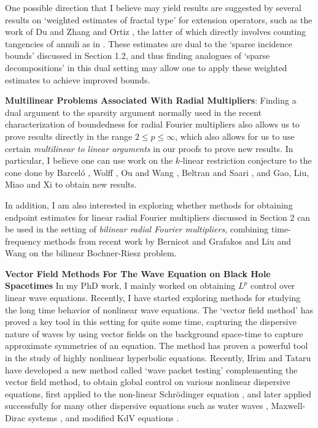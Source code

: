 \documentclass[11pt]{article}
\begin{document}
One possible direction that I believe may yield results are suggested by several results on `weighted estimates of fractal type' for extension operators, such as the work of Du and Zhang \cite{DuZhang} and Ortiz \cite{Ortiz}, the latter of which directly involves counting tangencies of annuli as in \cite{HeoNazarovSeeger}. These estimates are dual to the `sparse incidence bounds' discussed in Section 1.2, and thus finding analogues of `sparse decompositions' in this dual setting may allow one to apply these weighted estimates to achieve improved bounds.

{\bf Multilinear Problems Associated With Radial Multipliers}: Finding a dual argument to the sparsity argument normally used in the recent characterization of boundedness for radial Fourier multipliers also allows us to prove results directly in the range $2 \leq p \leq \infty$, which also allows for us to use certain \emph{multilinear to linear arguments} in our proofs to prove new results. In particular, I believe one can use work on the $k$-linear restriction conjecture to the cone done by Barcel\'{o} \cite{Barcelo}, Wolff \cite{Wolff}, Ou and Wang \cite{OuWang}, Beltran and Saari \cite{BeltranSaari}, and Gao, Liu, Miao and Xi \cite{GaoLiuMiaoXi} to obtain new results.

In addition, I am also interested in exploring whether methods for obtaining endpoint estimates for linear radial Fourier multipliers discussed in Section 2 can be used in the setting of \emph{bilinear radial Fourier multipliers}, combining time-frequency methods from recent work by Bernicot and Grafakos \cite{BernicotGrafakos} and Liu and Wang \cite{LiuWang} on the bilinear Bochner-Riesz problem.


{\bf Vector Field Methods For The Wave Equation on Black Hole Spacetimes} In my PhD work, I mainly worked on obtaining $L^p$ control over linear wave equations. Recently, I have started exploring methods for studying the long time behavior of nonlinear wave equations. The `vector field method' has proved a key tool in this setting for quite some time, capturing the dispersive nature of waves by using vector fields on the background space-time to capture approximate symmetries of an equation. The method has proven a powerful tool in the study of highly nonlinear hyperbolic equations. Recently, Ifrim and Tataru \cite{IfrimTataruWaterWaves} have developed a new method called `wave packet testing' complementing the vector field method, to obtain global control on various nonlinear dispersive equations, first applied to the non-linear Schr\"{o}dinger equation \cite{IfrimTataruNLS}, and later applied successfully for many other dispersive equations such as water waves \cite{IfrimTataruWaterWaves}, Maxwell-Dirac systems \cite{HerrIfrimSpitz}, and modified KdV equations \cite{Okamoto}.
\end{document}
